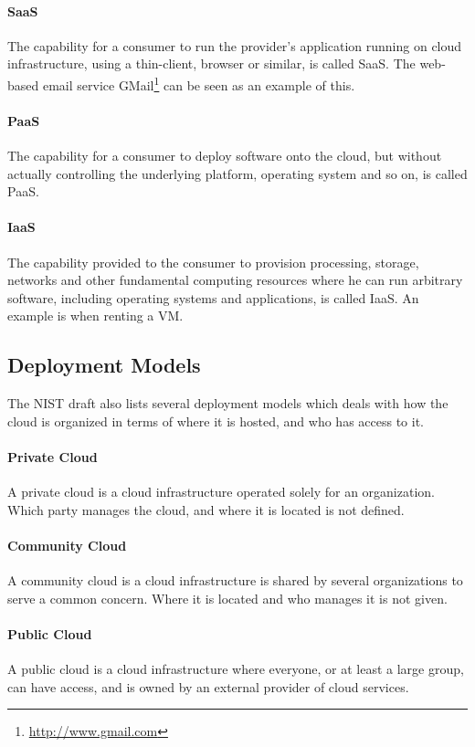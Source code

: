 \documentclass[pdftex,english,10pt,b5paper,twoside]{book}
\begin{document}
\paragraph{\ac{SaaS}} The capability for a consumer to run the provider's
application running on cloud infrastructure, using a thin-client, browser or
similar, is called \ac{SaaS}. The web-based email service
GMail\footnote{\url{http://www.gmail.com}} can be seen as an example of this.

\paragraph{\ac{PaaS}} The capability for a consumer to deploy software onto
the cloud, but without actually controlling the underlying platform, operating
system and so on, is called \ac{PaaS}.

\paragraph{\ac{IaaS}} The capability provided to the consumer to provision
processing, storage, networks and other fundamental computing resources where
he can run arbitrary software, including operating systems and applications, is
called \ac{IaaS}. An example is when renting a \ac{VM}.

\subsection{Deployment Models}

The \ac{NIST} draft \cite{cloud_nistdef} also lists several deployment models
which deals with how the cloud is organized in terms of where it is hosted, and
who has access to it.

\paragraph{Private Cloud} A private cloud is a cloud infrastructure operated
solely for an organization. Which party manages the cloud, and where it is
located is not defined.

\paragraph{Community Cloud} A community cloud is a cloud infrastructure is
shared by several organizations to serve a common concern. Where it is located
and who manages it is not given.

\paragraph{Public Cloud} A public cloud is a cloud infrastructure where
everyone, or at least a large group, can have access, and is owned by an external
provider of cloud services.
\end{document}
